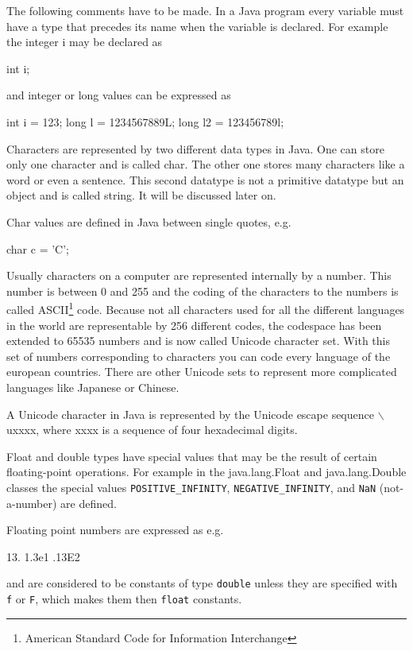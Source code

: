 The following comments have to be made. In a Java program every
variable must have a type that precedes its name when the variable is
declared. For example the integer i may be declared as
\begin{sverbatim}
int i;
\end{sverbatim}
and integer or long values can be expressed as
\begin{sverbatim}
int i = 123; 
long l = 1234567889L;     long l2 = 123456789l;
\end{sverbatim}

Characters are represented by two different data types in Java.
One can store only one character and is called char. The other
one stores many characters like a word or even a sentence. This
second datatype is not a primitive datatype but an object and is
called string. It will be discussed later on.

Char values are defined in Java between single quotes, e.g.
\begin{sverbatim}
char c = 'C';
\end{sverbatim}
Usually characters on a computer are represented internally by a number.
This number is between 0 and 255 and the coding of the characters
to the numbers is called ASCII\footnote{American Standard Code 
for Information Interchange} code. Because not all characters used
for all the different languages in the world are representable by
256 different codes, the codespace has been extended to 65535
numbers and is now called Unicode character set. With this set of
numbers corresponding to characters you can code every language
of the european countries. There are other Unicode sets to represent
more complicated languages like Japanese or Chinese.

A Unicode character in Java is represented by the Unicode escape sequence
$\backslash$uxxxx, where xxxx is a sequence of four hexadecimal digits.

Float and double types have special values that may be the result of
certain floating-point operations. For example in the java.lang.Float
and java.lang.Double classes the special values
\verb|POSITIVE_INFINITY|, \verb|NEGATIVE_INFINITY|, and 
\verb|NaN| (not-a-number) are
defined.

Floating point numbers are expressed as e.g.
\begin{sverbatim}
13.       1.3e1        .13E2 
\end{sverbatim}
and are considered to be constants of type \verb|double| 
unless they are specified with \verb|f| or \verb|F|, which makes them
then \verb|float| constants.

